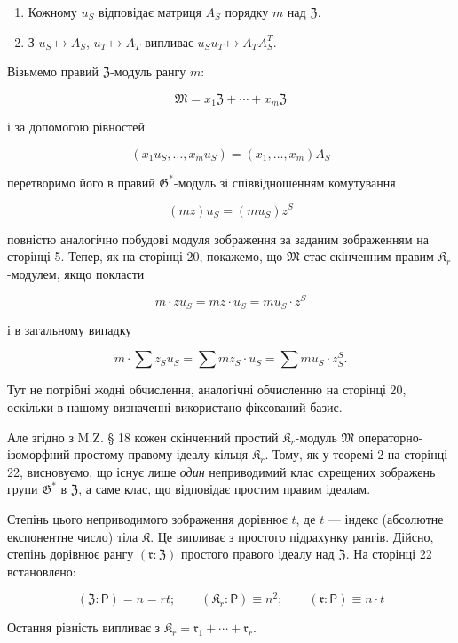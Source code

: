 \documentclass[11pt]{article}
\begin{document}
\begin{enumerate}
\item Кожному \(u_S\) відповідає матриця \(A_S\) порядку \(m\) над \(\mathfrak Z\).
\item З \(u_S \mapsto A_S\), \(u_T \mapsto A_T\) випливає \(u_Su_T \mapsto A_TA_S^T\).
\end{enumerate}

Візьмемо правий \(\mathfrak Z\)-модуль рангу \(m\):

\[\mathfrak{M}=x_1\mathfrak{Z}+\cdots+x_m\mathfrak{Z}\]

і за допомогою рівностей

\[(x_1u_S,\ldots,x_mu_S)=(x_1,\ldots,x_m)A_S\]

перетворимо його в правий \(\mathfrak G^*\)-модуль зі співвідношенням комутування

\[(mz) u_S = (mu_S) z^S\]

повністю аналогічно побудові модуля зображення за заданим зображенням на сторінці 5. Тепер, як на сторінці 20, покажемо, що \(\mathfrak{M}\) стає скінченним правим \(\mathfrak K_r\)-модулем, якщо покласти

\[m \cdot z u_S = mz \cdot u_S = mu_S \cdot z^S\]

і в загальному випадку

\[m \cdot \sum z_S u_S = \sum m z_S \cdot u_S = \sum m u_S \cdot z_S^S.\]

Тут не потрібні жодні обчислення, аналогічні обчисленню на сторінці 20, оскільки в нашому визначенні використано фіксований базис.

Але згідно з M.Z. § 18 кожен скінченний простий \(\mathfrak K_r\)-модуль \(\mathfrak{M}\) операторно-ізоморфний простому правому ідеалу кільця \(\mathfrak K_r\). Тому, як у теоремі 2 на сторінці 22, висновуємо, що існує лише \emph{один} неприводимий клас схрещених зображень групи \(\mathfrak{G}^*\) в \(\mathfrak Z\), а саме клас, що відповідає простим правим ідеалам.

Степінь цього неприводимого зображення дорівнює \(t\), де \(t\) --- індекс (абсолютне експонентне число) тіла \(\mathfrak K\). Це випливає з простого підрахунку рангів. Дійсно, степінь дорівнює рангу \((\mathfrak r:\mathfrak Z)\) простого правого ідеалу над \(\mathfrak Z\). На сторінці 22 встановлено:

\[
(\mathfrak Z:\mathsf{P})=n=rt;\qquad (\mathfrak K_r:\mathsf{P})\equiv n^2;\qquad (\mathfrak r:\mathsf{P})\equiv n\cdot t
\]

Остання рівність випливає з \(\mathfrak K_r = \mathfrak{r}_1 + \cdots + \mathfrak{r}_r\).
\end{document}
